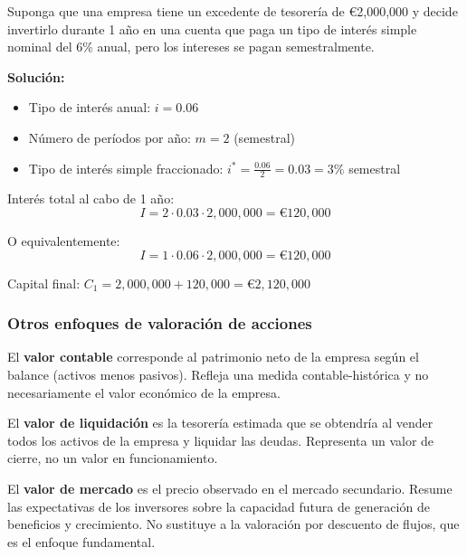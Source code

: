 \begin{ejemplo}
Suponga que una empresa tiene un excedente de tesorería de €2,000,000 y decide invertirlo durante 1 año en una cuenta que paga un tipo de interés simple nominal del 6\% anual, pero los intereses se pagan semestralmente.

\textbf{Solución:}
\begin{itemize}
\item Tipo de interés anual: $i = 0.06$
\item Número de períodos por año: $m = 2$ (semestral)
\item Tipo de interés simple fraccionado: $i^* = \frac{0.06}{2} = 0.03 = 3\%$ semestral
\end{itemize}

Interés total al cabo de 1 año:
$$I = 2 \cdot 0.03 \cdot 2{,}000{,}000 = \text{€}120{,}000$$

O equivalentemente:
$$I = 1 \cdot 0.06 \cdot 2{,}000{,}000 = \text{€}120{,}000$$

Capital final: $C_1 = 2{,}000{,}000 + 120{,}000 = \text{€}2{,}120{,}000$
\end{ejemplo}

\subsubsection{Otros enfoques de valoración de acciones}

\begin{definicion}
El \textbf{valor contable} corresponde al patrimonio neto de la empresa según el balance (activos menos pasivos). Refleja una medida contable-histórica y no necesariamente el valor económico de la empresa.
\end{definicion}

\begin{definicion}
El \textbf{valor de liquidación} es la tesorería estimada que se obtendría al vender todos los activos de la empresa y liquidar las deudas. Representa un valor de cierre, no un valor en funcionamiento.
\end{definicion}

\begin{definicion}
El \textbf{valor de mercado} es el precio observado en el mercado secundario. Resume las expectativas de los inversores sobre la capacidad futura de generación de beneficios y crecimiento. No sustituye a la valoración por descuento de flujos, que es el enfoque fundamental.
\end{definicion}

